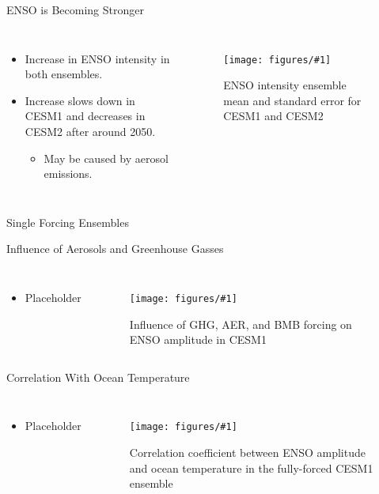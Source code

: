 \documentclass{beamer}
\newcommand{\myfig}[3]{
  \begin{figure}
    \centering
    \texttt{[image: figures/\#1]}
    \caption{#2}
    \label{fig:#3}
  \end{figure}
}
\begin{document}
\begin{frame}{ENSO is Becoming Stronger}
  \begin{columns}
    \begin{itemize}
    \item Increase in ENSO intensity in both ensembles.
    \item Increase slows down in CESM1 and decreases in CESM2 after around 2050.
      \begin{itemize}
      \item May be caused by aerosol emissions.
      \end{itemize}
    \end{itemize}
    \myfig{ff_compare.pdf}{ENSO intensity ensemble mean and standard error for CESM1 and CESM2}{ff_compare}
  \end{columns}
\end{frame}

\begin{frame}{Single Forcing Ensembles}

\end{frame}

\begin{frame}{Influence of Aerosols and Greenhouse Gasses}

  \begin{columns}
    \begin{itemize}
    \item Placeholder
    \end{itemize}
  \myfig{cesm1_sf_3.pdf}{Influence of GHG, AER, and BMB forcing on ENSO amplitude in CESM1}{cesm1_sf}
  \end{columns}

\end{frame}

\begin{frame}{Correlation With Ocean Temperature}

  \begin{columns}
    \begin{itemize}
    \item Placeholder
    \end{itemize}
  \myfig{tempdt.pdf}{Correlation coefficient between ENSO amplitude and ocean temperature in the fully-forced CESM1 ensemble}{tempdt}
  \end{columns}

\end{frame}
\end{document}

